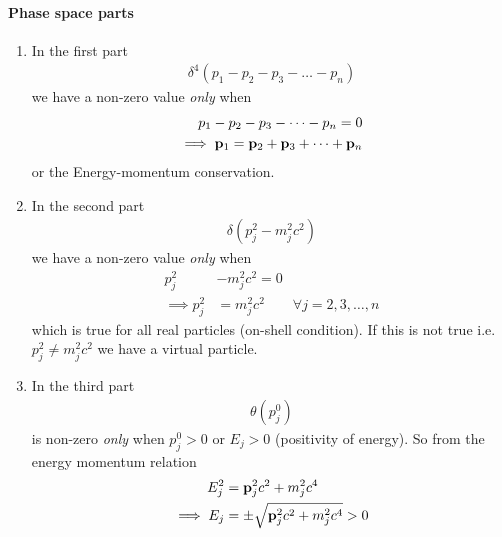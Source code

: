 \documentclass[../main.tex]{subfiles}
\begin{document}
\paragraph*{Phase space parts} 
\begin{enumerate}
    \item In the first part
    \begin{align*}
        \delta^4(p_1 - p_2 - p_3 - \dots - p_n)
    \end{align*}
    we have a non-zero value \emph{only} when
    \begin{align*}
        p_1 - p_2 - p_3 - \dots - p_n = 0 \\
        \implies \vb p_1 = \vb p_2 + \vb p_3 + \dots + \vb p_n
    \end{align*}
    or the Energy-momentum conservation. 
    \item In the second part
    \begin{align*}
        \delta(p_j^2 - m_j^2 c^2)
    \end{align*}
    we have a non-zero value \emph{only} when
    \begin{align*}
        p_j^2 &- m_j^2 c^2 = 0 \\
        \implies p_j^2 &= m_j^2 c^2 \qquad \forall j = 2, 3, \dots, n
    \end{align*}
    which is true for all real particles (on-shell condition). If this is not true i.e.
    $p_j^2 \neq m_j^2 c^2$ we have a virtual particle. 
    \item In the third part
    \begin{align*}
        \theta(p_j^0)
    \end{align*}
    is non-zero \emph{only} when $p_j^0 > 0$ or $E_j >0$ (positivity of energy). So from the
    energy momentum relation
    \begin{align*}
        E_j^2 &= \vb p_j^2 c^2 + m_j^2 c^4 \\
        \implies E_j &= \pm \sqrt{\vb p_j^2 c^2 + m_j^2 c^4} > 0
    \end{align*}
\end{enumerate}
\end{document}
